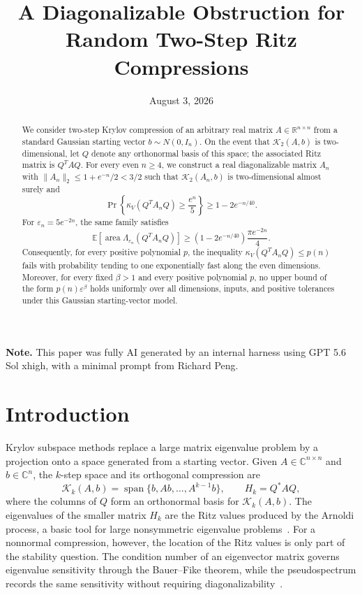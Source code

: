 \documentclass[11pt]{article}
\title{A Diagonalizable Obstruction for Random Two-Step Ritz Compressions}
\author{}
\date{August 3, 2026}
\begin{document}

\maketitle

\begin{abstract}
We consider two-step Krylov compression of an arbitrary real matrix
$A\in\mathbb R^{n\times n}$ from a standard Gaussian starting vector
$b\sim N(0,I_n)$.  On the event that $\mathcal K_2(A,b)$ is two-dimensional,
let $Q$ denote any orthonormal basis of this space; the associated Ritz matrix
is $Q^TAQ$.  For every even
$n\geq4$, we construct a real diagonalizable matrix $A_n$ with
$\lVert A_n\rVert_2\leq1+e^{-n}/2<3/2$ such that
$\mathcal K_2(A_n,b)$ is two-dimensional
almost surely and
\[
  \Pr\!\left\{\kappa_V(Q^TA_nQ)\geq \frac{e^n}{5}\right\}
  \geq 1-2e^{-n/40}.
\]
For $\varepsilon_n=5e^{-2n}$, the same family satisfies
\[
  \mathbb E\!\left[\operatorname{area}
  \Lambda_{\varepsilon_n}(Q^TA_nQ)\right]
  \geq \left(1-2e^{-n/40}\right)\frac{\pi e^{-2n}}4.
\]
Consequently, for every positive polynomial $p$, the inequality
$\kappa_V(Q^TA_nQ)\leq p(n)$ fails with probability tending to one
exponentially fast along the even dimensions.  Moreover, for every fixed
$\beta>1$ and every positive polynomial $p$, no upper bound of the form
$p(n)\varepsilon^\beta$ holds uniformly over all dimensions, inputs, and
positive tolerances under this Gaussian starting-vector model.
\end{abstract}

\noindent\textbf{Note.} This paper was fully AI generated by an internal
harness using GPT 5.6 Sol xhigh, with a minimal prompt from Richard Peng.

\clearpage
\tableofcontents
\clearpage


\section{Introduction}
\label{sec:introduction}

Krylov subspace methods replace a large matrix eigenvalue problem by a
projection onto a space generated from a starting vector.  Given
$A\in\mathbb C^{n\times n}$ and $b\in\mathbb C^n$, the $k$-step space and its
orthogonal compression are
\[
  \mathcal K_k(A,b)=\operatorname{span}\{b,Ab,\ldots,A^{k-1}b\},
  \qquad H_k=Q^*AQ,
\]
where the columns of $Q$ form an orthonormal basis for
$\mathcal K_k(A,b)$.  The eigenvalues of the smaller matrix $H_k$ are the Ritz
values produced by the Arnoldi process, a basic tool for large nonsymmetric
eigenvalue problems~\cite{Arnoldi1951MinimizedIterations,Saad1980VariationsArnoldi}.
For a nonnormal compression, however, the location of the Ritz values is only
part of the stability question.  The condition number of an eigenvector
matrix governs eigenvalue sensitivity through the Bauer--Fike theorem, while
the pseudospectrum records the same sensitivity without requiring
diagonalizability~\cite{BauerFike1960NormsExclusion,Trefethen1999ComputationPseudospectra}.
\end{document}
